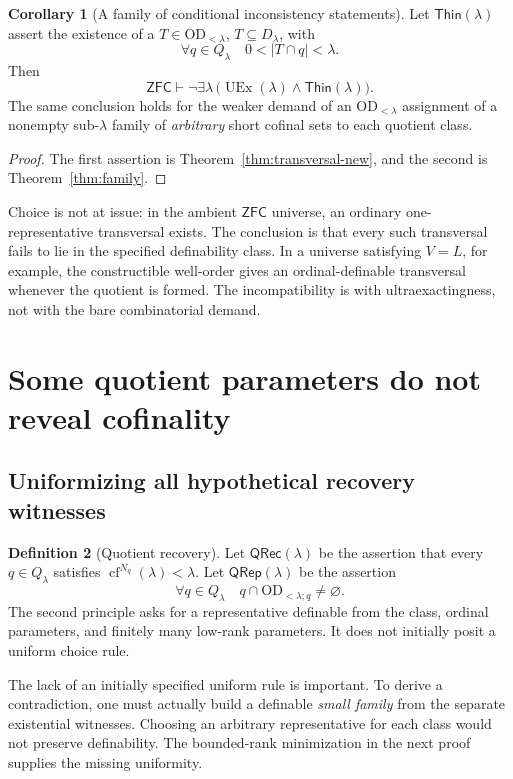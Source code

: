 \documentclass[11pt,letterpaper]{article}
\theoremstyle{definition}
\newtheorem{definition}{Definition}[section]
\newtheorem{corollary}[definition]{Corollary}
\numberwithin{equation}{section}
\newcommand{\ZFC}{\mathsf{ZFC}}
\newcommand{\OD}{\mathrm{OD}}
\newcommand{\UEx}{\operatorname{UEx}}
\newcommand{\cf}{\operatorname{cf}}
\newcommand{\Dlam}{D_\lambda}
\newcommand{\Qlam}{Q_\lambda}
\newcommand{\ODlo}{\OD_{<\lambda}}
\newcommand{\ODq}{\OD_{<\lambda;q}}
\newcommand{\QRec}{\mathsf{QRec}}
\newcommand{\QRep}{\mathsf{QRep}}
\newcommand{\Thin}{\mathsf{Thin}}
\begin{document}
\begin{corollary}[A family of conditional inconsistency statements]\label{cor:thin}
Let $\Thin(\lambda)$ assert the existence of a $T\in\ODlo$, $T\subseteq\Dlam$, with
\[
\forall q\in\Qlam\quad 0<|T\cap q|<\lambda.
\]
Then
\[
\ZFC\vdash\neg\exists\lambda\,
\bigl(\UEx(\lambda)\wedge\Thin(\lambda)\bigr).
\]
The same conclusion holds for the weaker demand of an $\ODlo$ assignment of a nonempty sub-$\lambda$ family of \emph{arbitrary} short cofinal sets to each quotient class.
\end{corollary}

\begin{proof}
The first assertion is Theorem~\ref{thm:transversal-new}, and the second is Theorem~\ref{thm:family}.
\end{proof}

Choice is not at issue: in the ambient $\ZFC$ universe, an ordinary one-representative transversal exists. The conclusion is that every such transversal fails to lie in the specified definability class. In a universe satisfying $V=L$, for example, the constructible well-order gives an ordinal-definable transversal whenever the quotient is formed. The incompatibility is with ultraexactingness, not with the bare combinatorial demand.

\section{Some quotient parameters do not reveal cofinality}\label{sec:goodq}

\subsection{Uniformizing all hypothetical recovery witnesses}

\begin{definition}[Quotient recovery]
Let $\QRec(\lambda)$ be the assertion that every $q\in\Qlam$ satisfies $\cf^{N_q}(\lambda)<\lambda$. Let $\QRep(\lambda)$ be the assertion
\[
\forall q\in\Qlam\quad q\cap\ODq\ne\varnothing.
\]
The second principle asks for a representative definable from the class, ordinal parameters, and finitely many low-rank parameters. It does not initially posit a uniform choice rule.
\end{definition}

The lack of an initially specified uniform rule is important. To derive a contradiction, one must actually build a definable \emph{small family} from the separate existential witnesses. Choosing an arbitrary representative for each class would not preserve definability. The bounded-rank minimization in the next proof supplies the missing uniformity.
\end{document}
